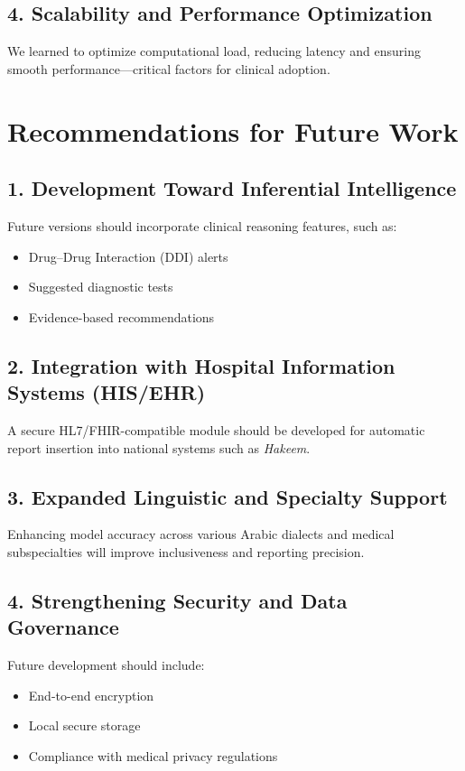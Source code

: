 \subsection*{4. Scalability and Performance Optimization}
We learned to optimize computational load, reducing latency and ensuring smooth performance—critical factors for clinical adoption.

\section{Recommendations for Future Work}
\label{sec:conclusion:recommend} 


\subsection*{1. Development Toward Inferential Intelligence}
Future versions should incorporate clinical reasoning features, such as:
\begin{itemize}
    \item Drug–Drug Interaction (DDI) alerts
    \item Suggested diagnostic tests
    \item Evidence-based recommendations
\end{itemize}

\subsection*{2. Integration with Hospital Information Systems (HIS/EHR)}
A secure HL7/FHIR-compatible module should be developed for automatic report insertion into national systems such as \textit{Hakeem}.

\subsection*{3. Expanded Linguistic and Specialty Support}
Enhancing model accuracy across various Arabic dialects and medical subspecialties will improve inclusiveness and reporting precision.

\subsection*{4. Strengthening Security and Data Governance}
Future development should include:
\begin{itemize}
    \item End-to-end encryption
    \item Local secure storage
    \item Compliance with medical privacy regulations
\end{itemize}

